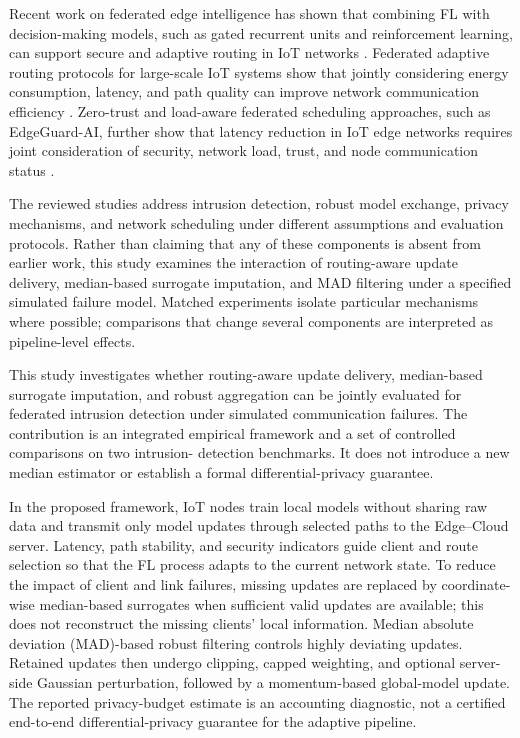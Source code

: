 \documentclass[5p,times,numafflabel]{elsarticle}
\begin{document}
	Recent work on federated edge intelligence has shown that combining
	FL with decision-making models, such as gated recurrent units and
	reinforcement learning, can support secure and adaptive routing in IoT
	networks \cite{abdallah2026routing}. Federated adaptive routing
	protocols for large-scale IoT systems show that jointly considering
	energy consumption, latency, and path quality can improve network
	communication efficiency \cite{zhang2026adaptive}. Zero-trust and
	load-aware federated scheduling approaches, such as EdgeGuard-AI,
	further show that latency reduction in IoT edge networks requires
	joint consideration of security, network load, trust, and node
	communication status \cite{alanazi2026edgeguard}.
	
	The reviewed studies address intrusion detection, robust model
	exchange, privacy mechanisms, and network scheduling under
	different assumptions and evaluation protocols. Rather than
	claiming that any of these components is absent from earlier work,
	this study examines the interaction of routing-aware update
	delivery, median-based surrogate imputation, and MAD filtering
	under a specified simulated failure model. Matched experiments
isolate particular mechanisms where possible; comparisons that
change several components are interpreted as pipeline-level effects.
	
	This study investigates whether routing-aware update delivery,
	median-based surrogate imputation, and robust aggregation can be
	jointly evaluated for federated intrusion detection under simulated
	communication failures. The contribution is an integrated empirical
	framework and a set of controlled comparisons on two intrusion-
	detection benchmarks. It does not introduce a new median estimator
	or establish a formal differential-privacy guarantee.
	
	In the proposed framework, IoT nodes train local models without
	sharing raw data and transmit only model updates through selected
	paths to the Edge--Cloud server. Latency, path stability, and security
	indicators guide client and route selection so that the FL process
adapts to the current network state. To reduce the impact of client and
	link failures, missing updates are replaced by coordinate-wise
	median-based surrogates when sufficient valid updates are available;
	this does not reconstruct the missing clients' local information.
	Median absolute deviation (MAD)-based robust filtering controls
	highly deviating updates. Retained updates then undergo clipping,
	capped weighting, and optional server-side Gaussian perturbation,
	followed by a momentum-based global-model update. The reported
	privacy-budget estimate is an accounting diagnostic, not a certified
	end-to-end differential-privacy guarantee for the adaptive pipeline.
	
\end{document}

